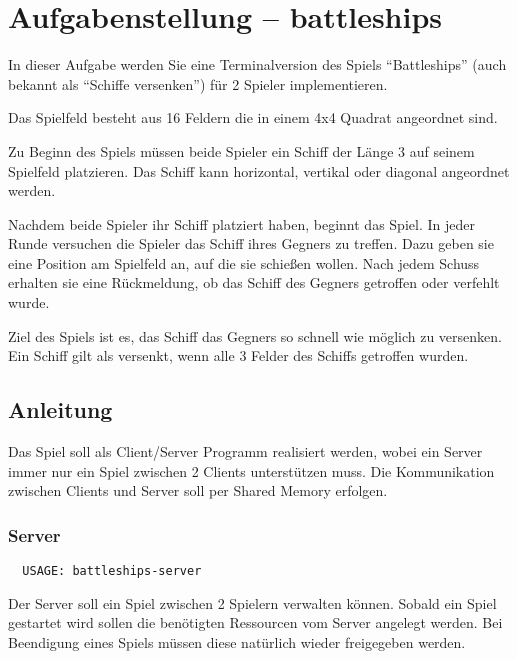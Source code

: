 




\section*{Aufgabenstellung -- battleships}

In dieser Aufgabe werden Sie eine Terminalversion des Spiels "`Battleships"'
(auch bekannt als "`Schiffe versenken"') für 2 Spieler implementieren.

Das Spielfeld besteht aus 16 Feldern die in einem 4x4 Quadrat angeordnet sind.

Zu Beginn des Spiels müssen beide Spieler ein Schiff der Länge 3 auf seinem
Spielfeld platzieren. Das Schiff kann horizontal, vertikal oder diagonal
angeordnet werden.

Nachdem beide Spieler ihr Schiff platziert haben, beginnt das Spiel. In jeder
Runde versuchen die Spieler das Schiff ihres Gegners zu treffen. Dazu geben sie
eine Position am Spielfeld an, auf die sie schießen wollen. Nach jedem Schuss
erhalten sie eine Rückmeldung, ob das Schiff des Gegners getroffen oder
verfehlt wurde.

Ziel des Spiels ist es, das Schiff das Gegners so schnell wie möglich zu
versenken.  Ein Schiff gilt als versenkt, wenn alle 3 Felder des Schiffs
getroffen wurden.


\subsection*{Anleitung}

Das Spiel soll als Client/Server Programm realisiert werden, wobei ein Server
immer nur ein Spiel zwischen 2 Clients unterstützen muss.
Die Kommunikation zwischen Clients und Server soll per Shared Memory erfolgen.

\subsubsection*{Server}

\begin{verbatim}
  USAGE: battleships-server
\end{verbatim}

Der Server soll ein Spiel zwischen 2 Spielern verwalten können.  Sobald ein
Spiel gestartet wird sollen die benötigten Ressourcen vom Server angelegt
werden.  Bei Beendigung eines Spiels müssen diese natürlich wieder freigegeben
werden.


